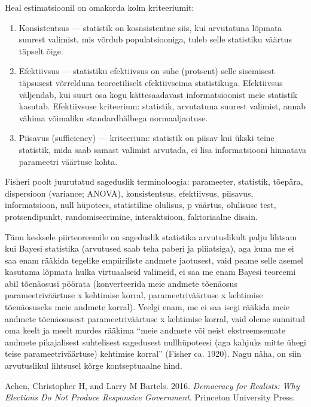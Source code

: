 \documentclass[]{book}
\begin{document}
Heal estimatsioonil on omakorda kolm kriteeriumit:

\begin{enumerate}
\def\labelenumi{\arabic{enumi}.}
\item
  Konsistentsus --- statistik on kosnsistentne siis, kui arvutatuna
  lõpmata suurest valimist, mis võrdub populatsiooniga, tuleb selle
  statistiku väärtus täpselt õige.
\item
  Efektiivsus --- statistiku efektiivsus on suhe (protsent) selle
  sisemisest täpsusest võrrelduna teoreetiliselt efektiivseima
  statistikuga. Efektiivsus väljendab, kui suurt osa kogu kättesaadavast
  informatsioonist meie statistik kasutab. Efektiivsuse kriteerium:
  statistik, arvutatuna suurest valimist, annab vähima võimaliku
  standardhälbega normaaljaotuse.
\item
  Piisavus (sufficiency) --- kriteerium: statistik on piisav kui ükski
  teine statistik, mida saab samast valimist arvutada, ei lisa
  informatsiooni hinnatava parameetri väärtuse kohta.
\end{enumerate}

Fisheri poolt juurutatud sageduslik terminoloogia: parameeter,
statistik, tõepära, dispersioon (variance; ANOVA), konsistentsus,
efektiivsus, piisavus, informatsioon, null hüpotees, statistiline
olulisus, p väärtus, olulisuse test, protsendipunkt, randomiseerimine,
interaktsioon, faktoriaalne disain.

Tänu kesksele piirteoreemile on sageduslik statistika arvutuslikult
palju lihtsam kui Bayesi statistika (arvutused saab teha paberi ja
pliiatsiga), aga kuna me ei saa enam rääkida tegelike empiiriliste
andmete jaotusest, vaid peame selle asemel kasutama lõpmata hulka
virtuaalseid valimeid, ei saa me enam Bayesi teoreemi abil tõenäosusi
pöörata (konverteerida meie andmete tõenäosus parameetriväärtuse x
kehtimise korral, parameetriväärtuse x kehtimise tõenäosuseks meie
andmete korral). Veelgi enam, me ei saa isegi rääkida meie andmete
tõenäosusest parameetriväärtuse x kehtimise korral, vaid oleme sunnitud
oma keelt ja meelt murdes rääkima ``meie andmete või neist
ekstreemsemate andmete pikajalisest suhtelisest sagedusest nullhüpoteesi
(aga kahjuks mitte ühegi teise parameetriväärtuse) kehtimise korral''
(Fisher ca. 1920). Nagu näha, on siin arvutuslikul lihtsusel kõrge
kontseptuaalne hind.

\hypertarget{refs}{}
\hypertarget{ref-achen2016democracy}{}
Achen, Christopher H, and Larry M Bartels. 2016. \emph{Democracy for
Realists: Why Elections Do Not Produce Responsive Government}. Princeton
University Press.
\end{document}
